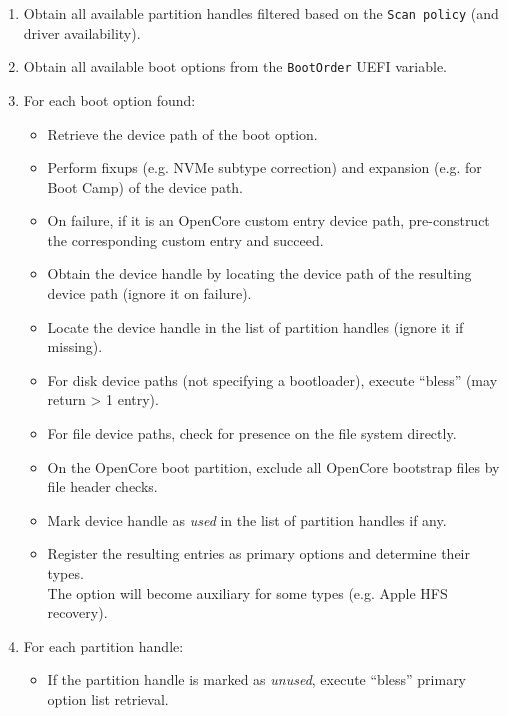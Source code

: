 \documentclass[]{article}
\providecommand{\tightlist}{%
  \setlength{\itemsep}{0pt}\setlength{\parskip}{0pt}}
\begin{document}
\begin{enumerate}
\tightlist
\item Obtain all available partition handles filtered based on the \texttt{Scan policy} (and driver availability).
\item Obtain all available boot options from the \texttt{BootOrder} UEFI variable.
\item For each boot option found:
  \begin{itemize}
  \item Retrieve the device path of the boot option.
  \item Perform fixups (e.g. NVMe subtype correction) and expansion (e.g. for Boot Camp) of the device path.
  \item On failure, if it is an OpenCore custom entry device path, pre-construct the corresponding custom entry and succeed.
  \item Obtain the device handle by locating the device path of the resulting device path (ignore it on failure).
  \item Locate the device handle in the list of partition handles (ignore it if missing).
  \item For disk device paths (not specifying a bootloader), execute ``bless'' (may return > 1 entry).
  \item For file device paths, check for presence on the file system directly.
  \item On the OpenCore boot partition, exclude all OpenCore bootstrap files by file header checks.
  \item Mark device handle as \textit{used} in the list of partition handles if any.
  \item Register the resulting entries as primary options and determine their types. \\
  The option will become auxiliary for some types (e.g. Apple HFS recovery).
  \end{itemize}
\item For each partition handle:
  \begin{itemize}
  \item If the partition handle is marked as \textit{unused}, execute ``bless'' primary option list retrieval. \\

\end{itemize}
\end{enumerate}
\end{document}
